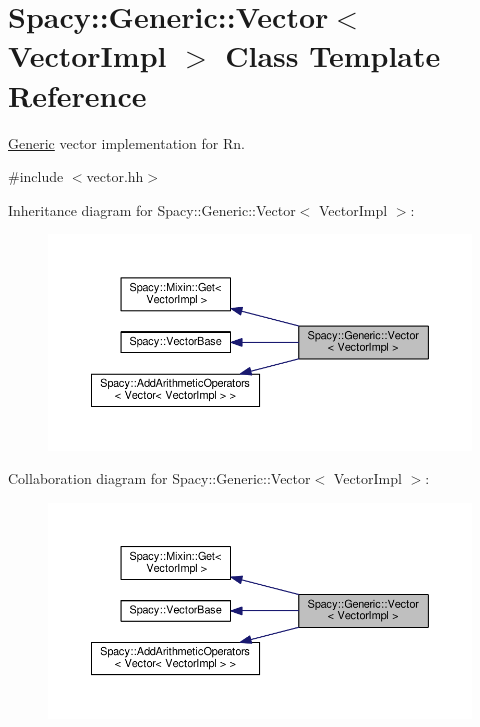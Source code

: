 \hypertarget{classSpacy_1_1Generic_1_1Vector}{}\section{Spacy\+:\+:Generic\+:\+:Vector$<$ Vector\+Impl $>$ Class Template Reference}
\label{classSpacy_1_1Generic_1_1Vector}


\hyperlink{namespaceSpacy_1_1Generic}{Generic} vector implementation for Rn.  




{\ttfamily \#include $<$vector.\+hh$>$}



Inheritance diagram for Spacy\+:\+:Generic\+:\+:Vector$<$ Vector\+Impl $>$\+:\nopagebreak
\begin{figure}[H]
\begin{center}
\leavevmode
\includegraphics[width=350pt]{classSpacy_1_1Generic_1_1Vector__inherit__graph}
\end{center}
\end{figure}


Collaboration diagram for Spacy\+:\+:Generic\+:\+:Vector$<$ Vector\+Impl $>$\+:\nopagebreak
\begin{figure}[H]
\begin{center}
\leavevmode
\includegraphics[width=350pt]{classSpacy_1_1Generic_1_1Vector__coll__graph}
\end{center}
\end{figure}
